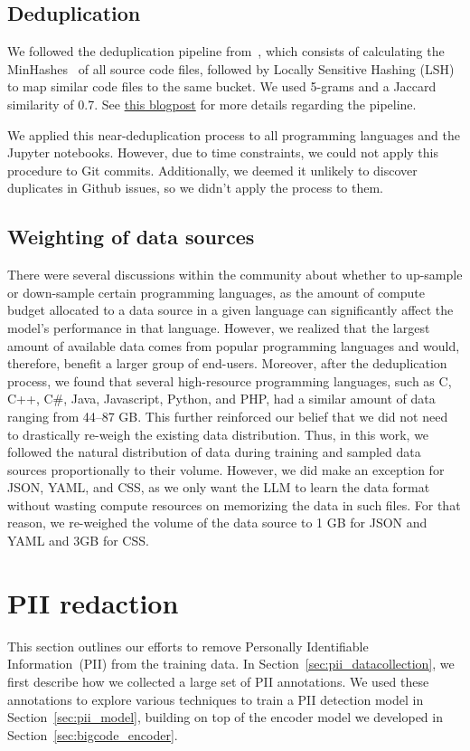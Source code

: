 \documentclass[10pt]{article} %
\begin{document}
\subsection{Deduplication}
We followed the deduplication pipeline from~\citet{allal2023santacoder}, which consists of calculating the MinHashes~\citep{broder2000identifying} of all source code files, followed by Locally Sensitive Hashing (LSH) to map similar code files to the same bucket. We used 5-grams and a Jaccard similarity of 0.7. See \href{https://chenghaomou.github.io/posts/20230220150602}{this blogpost} for more details regarding the pipeline. 

We applied this near-deduplication process to all programming languages and the Jupyter notebooks. However, due to time constraints, we could not apply this procedure to Git commits. Additionally, we deemed it unlikely to discover duplicates in Github issues, so we didn't apply the process to them. 

\subsection{Weighting of data sources}\label{sec:Weighting}
There were several discussions within the community about whether to up-sample or down-sample certain programming languages, as the amount of compute budget allocated to a data source in a given language can significantly affect the model's performance in that language. However, we realized that the largest amount of available data comes from popular programming languages and would, therefore, benefit a larger group of end-users. Moreover, after the deduplication process, we found that several high-resource programming languages, such as C, C++, C\#, Java, Javascript, Python, and PHP, had a similar amount of data ranging from 44--87 GB. This further reinforced our belief that we did not need to drastically re-weigh the existing data distribution. Thus, in this work, we followed the natural distribution of data during training and sampled data sources proportionally to their volume. However, we did make an exception for JSON, YAML, and CSS, as we only want the LLM to learn the data format without wasting compute resources on memorizing the data in such files. For that reason, we re-weighed the volume of the data source to 1 GB for JSON and YAML and 3GB for CSS.

\section{PII redaction}\label{sec:PII}
This section outlines our efforts to remove Personally Identifiable Information~(PII) from the training data. In Section~\ref{sec:pii_datacollection}, we first describe how we collected a large set of PII annotations. We used these annotations to explore various techniques to train a PII detection model in Section~\ref{sec:pii_model}, building on top of the encoder model we developed in Section~\ref{sec:bigcode_encoder}. 
\end{document}
